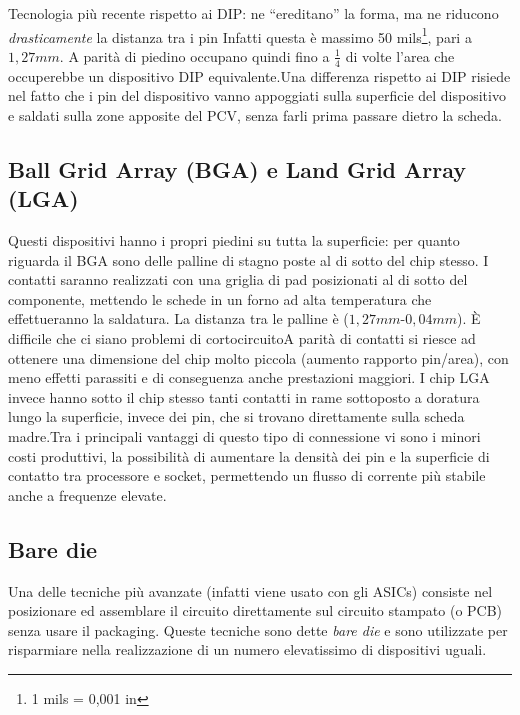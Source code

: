 \documentclass[
]{book}
\begin{document}
Tecnologia più recente rispetto ai DIP: ne ``ereditano'' la forma, ma ne
riducono \emph{drasticamente} la distanza tra i pin Infatti questa è
massimo 50 mils\footnote{1 mils = 0,001 in}, pari a \(1,27mm\). A parità
di piedino occupano quindi fino a \(\frac{1}{4}\) di volte l'area che
occuperebbe un dispositivo DIP equivalente.\newline Una differenza
rispetto ai DIP risiede nel fatto che i pin del dispositivo vanno
appoggiati sulla superficie del dispositivo e saldati sulla zone
apposite del PCV, senza farli prima passare dietro la scheda.

\subsection{Ball Grid Array (BGA) e Land Grid Array
(LGA)}\label{ball-grid-array-bga-e-land-grid-array-lga}

Questi dispositivi hanno i propri piedini su tutta la superficie: per
quanto riguarda il BGA sono delle palline di stagno poste al di sotto
del chip stesso. I contatti saranno realizzati con una griglia di pad
posizionati al di sotto del componente, mettendo le schede in un forno
ad alta temperatura che effettueranno la saldatura. La distanza tra le
palline è (\(1,27mm\)-\(0,04mm\)). È difficile che ci siano problemi di
cortocircuito\newline A parità di contatti si riesce ad ottenere una
dimensione del chip molto piccola (aumento rapporto pin/area), con meno
effetti parassiti e di conseguenza anche prestazioni maggiori. \newline
I chip LGA invece hanno sotto il chip stesso tanti contatti in rame
sottoposto a doratura lungo la superficie, invece dei pin, che si
trovano direttamente sulla scheda madre.\newline Tra i principali
vantaggi di questo tipo di connessione vi sono i minori costi
produttivi, la possibilità di aumentare la densità dei pin e la
superficie di contatto tra processore e socket, permettendo un flusso di
corrente più stabile anche a frequenze elevate.

\subsection{Bare die}\label{bare-die}

Una delle tecniche più avanzate (infatti viene usato con gli ASICs)
consiste nel posizionare ed assemblare il circuito direttamente sul
circuito stampato (o PCB) senza usare il packaging. Queste tecniche sono
dette \emph{bare die} e sono utilizzate per risparmiare nella
realizzazione di un numero elevatissimo di dispositivi uguali.
\end{document}
